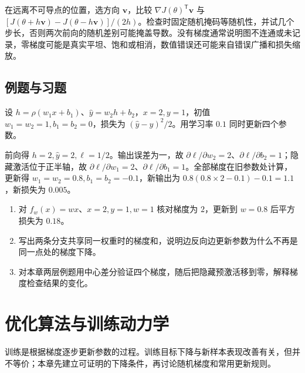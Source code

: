 \documentclass[UTF8,12pt,a4paper,fontset=fandol]{ctexbook}
\begin{document}
在远离不可导点的位置，选方向 $\mathbf v$，比较 $\nabla J(\theta)^\mathsf T\mathbf v$ 与 $[J(\theta+h\mathbf v)-J(\theta-h\mathbf v)]/(2h)$。检查时固定随机掩码等随机性，并试几个步长，否则两次前向的随机差别可能掩盖导数。没有梯度通常说明图不连通或未记录，零梯度可能是真实平坦、饱和或相消，数值错误还可能来自错误广播和损失缩放。

\section{例题与习题}
\begin{example}[一次完整的两层更新]
设 $h=\rho(w_1x+b_1)$、$\widehat y=w_2h+b_2$，$x=2,y=1$，初值 $w_1=w_2=1,b_1=b_2=0$，损失为 $(\widehat y-y)^2/2$。用学习率 $0.1$ 同时更新四个参数。
\end{example}
\begin{solve}
前向得 $h=2,\widehat y=2,\ell=1/2$。输出误差为一，故 $\partial\ell/\partial w_2=2$、$\partial\ell/\partial b_2=1$；隐藏激活位于正半轴，故 $\partial\ell/\partial w_1=2$、$\partial\ell/\partial b_1=1$。全部梯度在旧参数处计算，更新得 $w_1=w_2=0.8,b_1=b_2=-0.1$，新输出为 $0.8(0.8\times2-0.1)-0.1=1.1$，新损失为 $0.005$。
\end{solve}
\begin{enumerate}
\item 对 $f_w(x)=wx$、$x=2,y=1,w=1$ 核对梯度为 $2$，更新到 $w=0.8$ 后平方损失为 $0.18$。
\item 写出两条分支共享同一权重时的梯度和，说明边反向边更新参数为什么不再是同一点处的梯度下降。
\item 对本章两层例题用中心差分验证四个梯度，随后把隐藏预激活移到零，解释梯度检查结果的变化。
\end{enumerate}

\chapter{优化算法与训练动力学}
\label{chap:dl-optimization}
训练是根据梯度逐步更新参数的过程。训练目标下降与新样本表现改善有关，但并不等价；本章先建立可证明的下降条件，再讨论随机梯度和常用更新规则。
\end{document}
